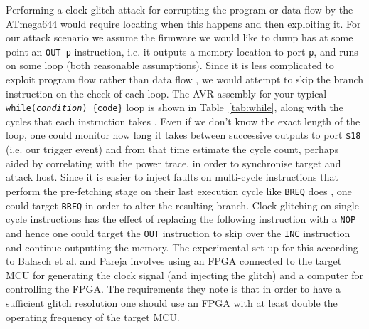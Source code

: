 Performing a clock-glitch attack for corrupting the program or data flow by the ATmega644 would require locating when this happens and then exploiting it. For our attack scenario we assume the firmware we would like to dump has at some point an \texttt{OUT p} instruction, i.e. it outputs a memory location to port \texttt{p}, and runs on some loop (both reasonable assumptions). Since it is less complicated to exploit program flow rather than data flow \citep{glitches_paper}, we would attempt to skip the branch instruction on the check of each loop. The AVR assembly for your typical \texttt{while(\emph{condition}) \{code\}} loop is shown in Table~\ref{tab:while}, along with the cycles that each instruction takes \citep{atmega_manual}. Even if we don't know the exact length of the loop, one could monitor how long it takes between successive outputs to port \texttt{\$18} (i.e. our trigger event) and from that time estimate the cycle count, perhaps aided by correlating with the power trace, in order to synchronise target and attack host. Since it is easier to inject faults on multi-cycle instructions that perform the pre-fetching stage on their last execution cycle like \texttt{BREQ} does \citep{glitches_paper}, one could target \texttt{BREQ} in order to alter the resulting branch. Clock glitching on single-cycle instructions has the effect of replacing the following instruction with a \texttt{NOP} \citep{glitches_paper} and hence one could target the \texttt{OUT} instruction to skip over the \texttt{INC} instruction and continue outputting the memory. The experimental set-up for this according to Balasch et al. \citep{glitches_paper} and Pareja \citep{pareja:glitch} involves using an FPGA connected to the target MCU for generating the clock signal (and injecting the glitch) and a computer for controlling the FPGA. The requirements they note is that in order to have a sufficient glitch resolution one should use an FPGA with at least double the operating frequency of the target MCU.

